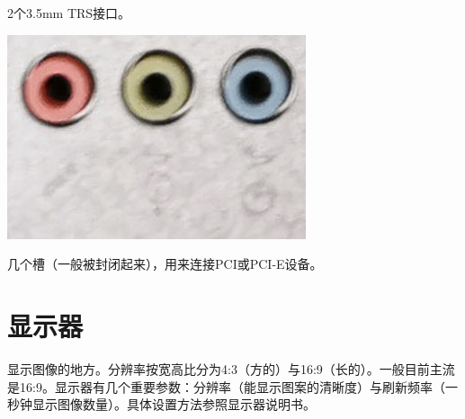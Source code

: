 2个3.5mm TRS接口。
\begin{center}
	\includegraphics[scale=0.3]{pic/TRS}
\end{center}\par
几个槽（一般被封闭起来），用来连接PCI或PCI-E设备。
\section{显示器}
显示图像的地方。分辨率按宽高比分为4:3（方的）与16:9（长的）。一般目前主流是16:9。显示器有几个重要参数：分辨率（能显示图案的清晰度）与刷新频率（一秒钟显示图像数量）。具体设置方法参照显示器说明书。
